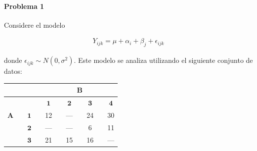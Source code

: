 \documentclass[10pt,a4paper]{report}
\author{Guadalupe Monroy}
\begin{document}

\paragraph{Problema 1} Considere el modelo

\begin{align*}
    {Y}_{ijk} = \mu + {\alpha}_{i} + {\beta}_{j} + {\epsilon}_{ijk}
\end{align*}

donde ${\epsilon}_{ijk} \sim N(0,{\sigma}^{2})$. Este modelo se analiza utilizando el siguiente conjunto de datos:\\
\begin{table}[h]
    \centering
    \begin{tabular}{ccccccccccc}
    \hline \hline
    & & & & \multicolumn{7}{c}{\textbf{B}} \\ \hline
    & & & & $\mathbf{1}$ & & $\mathbf{2}$ & & $\mathbf{3}$ & & $\mathbf{4}$ \\ 
    \textbf{A} & & $\mathbf{1}$ & & 12 & & --- & & 24 & & 30 \\
    & & $\mathbf{2}$ & & --- & & --- & & 6 & & 11 \\
    & & $\mathbf{3}$ & & 21 & & 15 & & 16 & & --- \\ 
    \hline \hline
    \end{tabular}
    \label{tab1P1}
\end{table}
\end{document}
